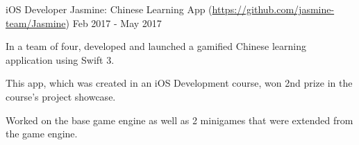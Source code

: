 

\begin{cventries}

  \cventry
  {iOS Developer} %
  {Jasmine: Chinese Learning App (\url{https://github.com/jasmine-team/Jasmine})} %
  {} %
  {Feb 2017 - May 2017} %
  {
    \begin{cvitems} %
    \item {In a team of four, developed and launched a gamified Chinese learning application using Swift 3.}
    \item {This app, which was created in an iOS Development course, won 2nd prize in the course's project showcase.}
    \item {Worked on the base game engine as well as 2 minigames that were extended from the game engine.}
    \end{cvitems}
  }



\end{cventries}
